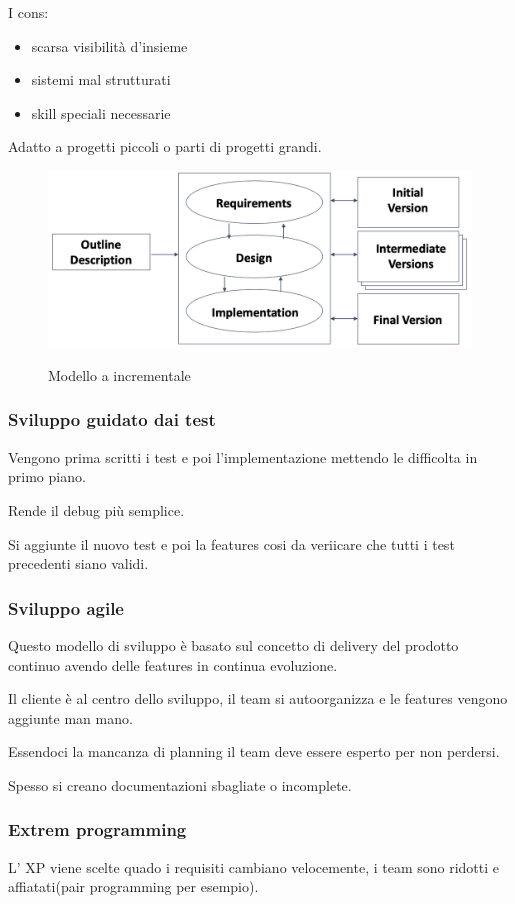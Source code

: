 \documentclass{article}
\begin{document}
I cons:
\begin{itemize}
    \item scarsa visibilità d'insieme
    \item sistemi mal strutturati
    \item skill speciali necessarie
\end{itemize}

Adatto a progetti piccoli o parti di progetti grandi.

\begin{figure}[h!]
    \centering
    \includegraphics[width=0.5\linewidth]{imgs/3 - incrementale.png}
    \label{fig:modello_incrementale}
    \caption{Modello a incrementale}
\end{figure}

\subsubsection{Sviluppo guidato dai test}
Vengono prima scritti i test e poi l'implementazione mettendo le difficolta in primo piano.

Rende il debug più semplice.

Si aggiunte il nuovo test e poi la features cosi da veriicare che tutti i test 
precedenti siano validi.

\subsubsection{Sviluppo agile}
Questo modello di sviluppo è basato sul concetto di delivery del prodotto continuo 
avendo delle features in continua evoluzione.

Il cliente è al centro dello sviluppo, il team si autoorganizza e le features 
vengono aggiunte man mano.

Essendoci la mancanza di planning il team deve essere esperto per non perdersi.


Spesso si creano documentazioni sbagliate o incomplete.

\subsubsection{Extrem programming}
L' XP viene scelte quado i requisiti cambiano velocemente, i team sono ridotti
e affiatati(pair programming per esempio).
\end{document}
